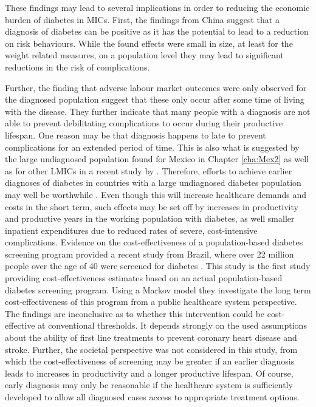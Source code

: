 These findings may lead to several implications in order to reducing the economic burden of diabetes in \acp{MIC}. First, the findings from China suggest that a diagnosis of diabetes can be positive as it has the potential to lead to a reduction on risk behaviours. While the found effects were small in size, at least for the weight related measures, on a population level they may lead to significant reductions in the risk of complications.

Further, the finding that adverse labour market outcomes were only observed for the diagnosed population suggest that these only occur after some time of living with the disease. They further indicate that many people with a diagnosis are not able to prevent debilitating complications to occur during their productive lifespan. One reason may be that diagnosis happens to late to prevent complications for an extended period of time. This is also what is suggested by the large undiagnosed population found for Mexico in Chapter \ref{cha:Mex2} as well as for other \acp{LMIC} in a recent study by \textcite{Beagley2014}. Therefore, efforts to achieve earlier diagnoses of diabetes in countries with a large undiagnosed diabetes population may well be worthwhile \parencite{Engelgau2012}. Even though this will increase healthcare demands and costs in the short term, such effects may be set off by increases in productivity and productive years in the working population with diabetes, as well smaller inpatient expenditures due to reduced rates of severe, cost-intensive complications. Evidence on the cost-effectiveness of a population-based diabetes screening program provided a recent study from Brazil, where over 22 million people over the age of 40 were screened for diabetes \parencite{Toscano2015}. This study is the first study providing cost-effectiveness estimates based on an actual population-based diabetes screening program. Using a Markov model they investigate the long term cost-effectiveness of this program from a public healthcare system perspective. The findings are inconclusive as to whether this intervention could be cost-effective at conventional thresholds. It depends strongly on the used assumptions about the ability of first line treatments to prevent coronary heart disease and stroke. Further, the societal perspective was not considered in this study, from which the cost-effectiveness of screening may be greater if an earlier diagnosis leads to increases in productivity and a longer productive lifespan. Of course, early diagnosis may only be reasonable if the healthcare system is sufficiently developed to allow all diagnosed cases access to appropriate treatment options. 

